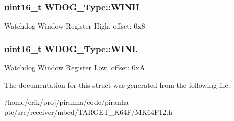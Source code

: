 \subsubsection[{\texorpdfstring{W\+I\+NH}{WINH}}]{ uint16\+\_\+t W\+D\+O\+G\+\_\+\+Type\+::\+W\+I\+NH}\hypertarget{structWDOG__Type_a4608cedb5b58dd05e3b21bca39c0bd21}{}\label{structWDOG__Type_a4608cedb5b58dd05e3b21bca39c0bd21}
Watchdog Window Register High, offset\+: 0x8 
\subsubsection[{\texorpdfstring{W\+I\+NL}{WINL}}]{ uint16\+\_\+t W\+D\+O\+G\+\_\+\+Type\+::\+W\+I\+NL}\hypertarget{structWDOG__Type_a90d84b2d35ad1badbf17fbcb333583ad}{}\label{structWDOG__Type_a90d84b2d35ad1badbf17fbcb333583ad}
Watchdog Window Register Low, offset\+: 0xA 

The documentation for this struct was generated from the following file\+:\begin{DoxyCompactItemize}
\item 
/home/erik/proj/piranha/code/piranha-\/ptc/src/receiver/mbed/\+T\+A\+R\+G\+E\+T\+\_\+\+K64\+F/M\+K64\+F12.\+h\end{DoxyCompactItemize}
